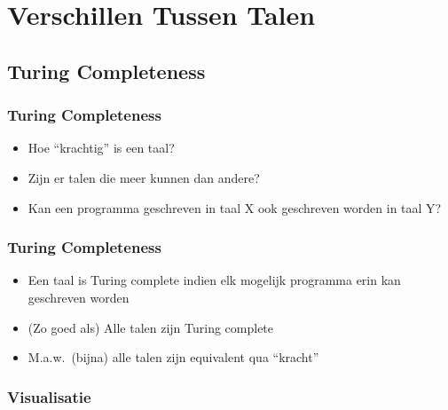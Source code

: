 \section{Verschillen Tussen Talen}

\subsection{Turing Completeness}

\begin{frame}
  \tableofcontents[currentsection]
\end{frame}

\begin{frame}
  \frametitle{Turing Completeness}
  \begin{itemize}
    \item Hoe ``krachtig'' is een taal?
    \item Zijn er talen die meer kunnen dan andere?
    \item Kan een programma geschreven in taal X ook geschreven worden in taal Y?
  \end{itemize}
\end{frame}

\begin{frame}
  \frametitle{Turing Completeness}
  \begin{itemize}
    \item Een taal is Turing complete indien elk mogelijk programma erin kan geschreven worden
    \item (Zo goed als) Alle talen zijn Turing complete
    \item M.a.w.~(bijna) alle talen zijn equivalent qua ``kracht''
  \end{itemize}
\end{frame}

\begin{frame}
  \frametitle{Visualisatie}
  \begin{center}
  \end{center}
\end{frame}


